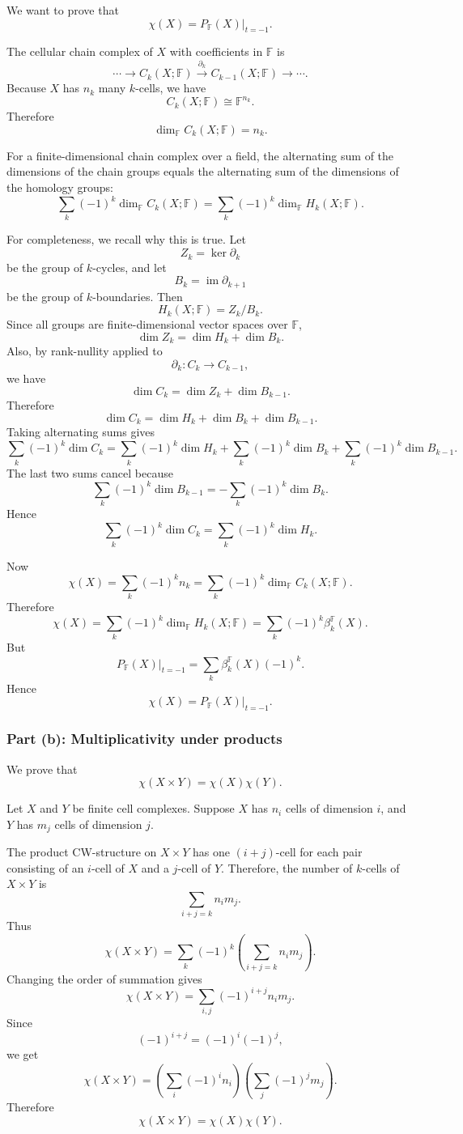 \documentclass[12pt,a4paper]{article}
\theoremstyle{notespace}
\begin{document}
We want to prove that
\[
\chi(X)=P_{\mathbb F}(X)\big|_{t=-1}.
\]

The cellular chain complex of \(X\) with coefficients in \(\mathbb F\) is
\[
\cdots
\longrightarrow
C_k(X;\mathbb F)
\xrightarrow{\partial_k}
C_{k-1}(X;\mathbb F)
\longrightarrow
\cdots.
\]
Because \(X\) has \(n_k\) many \(k\)-cells, we have
\[
C_k(X;\mathbb F)\cong \mathbb F^{n_k}.
\]
Therefore
\[
\dim_{\mathbb F} C_k(X;\mathbb F)=n_k.
\]

For a finite-dimensional chain complex over a field, the alternating sum of the dimensions of the chain groups equals the alternating sum of the dimensions of the homology groups:
\[
\sum_k (-1)^k \dim_{\mathbb F} C_k(X;\mathbb F)
=
\sum_k (-1)^k \dim_{\mathbb F} H_k(X;\mathbb F).
\]

For completeness, we recall why this is true. Let
\[
Z_k=\ker \partial_k
\]
be the group of \(k\)-cycles, and let
\[
B_k=\operatorname{im}\partial_{k+1}
\]
be the group of \(k\)-boundaries. Then
\[
H_k(X;\mathbb F)=Z_k/B_k.
\]
Since all groups are finite-dimensional vector spaces over \(\mathbb F\),
\[
\dim Z_k=\dim H_k+\dim B_k.
\]
Also, by rank-nullity applied to
\[
\partial_k:C_k\to C_{k-1},
\]
we have
\[
\dim C_k=\dim Z_k+\dim B_{k-1}.
\]
Therefore
\[
\dim C_k
=
\dim H_k+\dim B_k+\dim B_{k-1}.
\]
Taking alternating sums gives
\[
\sum_k (-1)^k \dim C_k
=
\sum_k (-1)^k \dim H_k
+
\sum_k (-1)^k \dim B_k
+
\sum_k (-1)^k \dim B_{k-1}.
\]
The last two sums cancel because
\[
\sum_k (-1)^k \dim B_{k-1}
=
-\sum_k (-1)^k \dim B_k.
\]
Hence
\[
\sum_k (-1)^k \dim C_k
=
\sum_k (-1)^k \dim H_k.
\]

Now
\[
\chi(X)
=
\sum_k (-1)^k n_k
=
\sum_k (-1)^k \dim_{\mathbb F} C_k(X;\mathbb F).
\]
Therefore
\[
\chi(X)
=
\sum_k (-1)^k \dim_{\mathbb F} H_k(X;\mathbb F)
=
\sum_k (-1)^k \beta_k^{\mathbb F}(X).
\]
But
\[
P_{\mathbb F}(X)\big|_{t=-1}
=
\sum_k \beta_k^{\mathbb F}(X)(-1)^k.
\]
Hence
\[
\boxed{
	\chi(X)=P_{\mathbb F}(X)\big|_{t=-1}.}
\]

\subsubsection{Part (b): Multiplicativity under products}

We prove that
\[
\chi(X\times Y)=\chi(X)\chi(Y).
\]

Let \(X\) and \(Y\) be finite cell complexes. Suppose \(X\) has \(n_i\) cells of dimension \(i\), and \(Y\) has \(m_j\) cells of dimension \(j\).

The product CW-structure on \(X\times Y\) has one \((i+j)\)-cell for each pair consisting of an \(i\)-cell of \(X\) and a \(j\)-cell of \(Y\). Therefore, the number of \(k\)-cells of \(X\times Y\) is
\[
\sum_{i+j=k} n_i m_j.
\]
Thus
\[
\chi(X\times Y)
=
\sum_k (-1)^k
\left(
\sum_{i+j=k} n_i m_j
\right).
\]
Changing the order of summation gives
\[
\chi(X\times Y)
=
\sum_{i,j} (-1)^{i+j}n_i m_j.
\]
Since
\[
(-1)^{i+j}=(-1)^i(-1)^j,
\]
we get
\[
\chi(X\times Y)
=
\left(\sum_i (-1)^i n_i\right)
\left(\sum_j (-1)^j m_j\right).
\]
Therefore
\[
\chi(X\times Y)=\chi(X)\chi(Y).
\]
\end{document}
